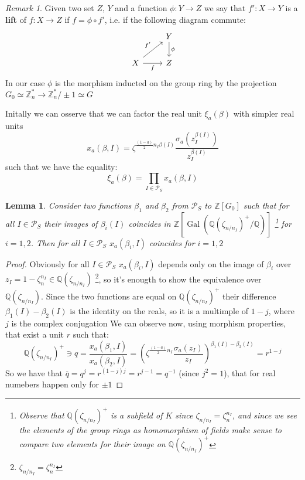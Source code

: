 \documentclass[]{article}
\theoremstyle{plain}
\newtheorem{lem}[teo]{Lemma}
\theoremstyle{remark}
\newtheorem{rem}{Remark}
\theoremstyle{definition}
\newcommand{\PS}{\mathcal{P}_S}
\newcommand{\Z}{\mathbb{Z}}
\newcommand{\Q}{\mathbb{Q}}
\DeclareMathOperator{\Gal}{Gal}
\begin{document}
	\begin{rem}
		Given two set $ Z, \, Y $ and a function $ \phi : Y \to Z $ we say that $ f' : X \to Y $ is a \textbf{lift} of $ f : X \to Z $ if $ f = \phi \circ f' $, i.e. if the following diagram commute: 
		\[\begin{tikzcd}
		 & {Y} \arrow[d, " \phi"] \\
		{X} \arrow[r, "f"'] \arrow[ru, "f'"] & {Z}               
		\end{tikzcd}\]
		In our case $\phi$ is the morphism inducted on the group ring by the projection $G_0 \simeq  \Z_n^\ast  \to  \Z_n^\ast / \pm 1  \simeq G$
	\end{rem}
	
	Initally we can osserve that we can factor the real unit $\xi_a(\beta)$ with simpler real units
	\begin{equation*}
		x_a(\beta , I) = \zeta ^{\frac{(1-a)}{2} n_I \beta (I)} \frac{\sigma_a (	z_I ^{\beta(I)})}{z_I ^{\beta(I)}} 
	\end{equation*}
	such that we have the equality:
	\begin{equation}\label{eq:fact_xi}
		 \xi_a(\beta) = \prod_{I \in \PS}  x_a(\beta , I)
	\end{equation} 
	
	\begin{lem} \label{lem:gooddef}
		Consider two functions $ \beta_1 $ and $ \beta_2 $ from $ \PS $ to $ \Z[G_0] $ such that for all $ I \in \PS $ their images of $ \beta_i (I)$ coincides in $ \Z[\Gal( \Q(\zeta_{n/n_I})^+ / \Q )] $ \footnote{Observe that $ \Q(\zeta_{n/n_I})^+ $ is a subfield of $ K $ since $ \zeta_{n/n_I} =  \zeta_n^{n_I}$, and since we see the elements of the group rings as homomorphism of fields make sense to compare two elements for their image on $\Q(\zeta_{n/n_I})^+ $ %
		} for $ i= 1,2 $. Then for all $ I \in \PS $ $ x_a(\beta_i, I) $ coincides for $ i=1,2 $
	\end{lem}

	\begin{proof}
		Obviously for all $ I \in \PS $ $ 	x_a(\beta_i , I) $ depends only on the image of $ \beta_i $ over $ z_I = 1- \zeta_n ^{n_I} \in \Q(\zeta_{n/n_I}) $ \footnote{ $ \zeta_{n/n_I} =  \zeta_n^{n_I} $}, so it's enougth to show the equivalence over $  \Q(\zeta_{n/n_I}). $ Since the two functions are equal on $ \Q(\zeta_{n/n_I})^+ $ their difference $ \beta_1(I) - \beta_2 (I)  $ is the identity on the reals, so it is a multimple of $ 1 - j $, where $ j $ is the complex conjugation %
		We can observe now, using morphism properties, that exist a unit $ r $ such that:
		\begin{equation*}
			\Q (\zeta_{n/n_I})^+ \ni q = \frac{x_a(\beta_1 , I)}{x_a(\beta_2 , I)} = {\left( \zeta ^{\frac{(1-a)}{2} n_I } \frac{\sigma_a (	z_I )}{z_I } \right)  }^{\beta_1(I) - \beta_2 (I)} = r ^{1-j}
		\end{equation*}	
		So we have that $ \overline{q}=q^j = r^{(1-j)j} = r^{j  - 1 }= q^{-1}$ (since $j^2 = 1 $), that for real numebers happen only for $ \pm 1 $
	\end{proof}
\end{document}
